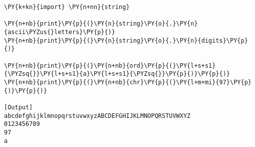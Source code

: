 \begin{Verbatim}[label=\makebox{\href{https://github.com/unipi-physics-labs/statnotes/tree/main/snippy/ascii.py}{https://github.com/.../ascii.py}},commandchars=\\\{\}]
\PY{k+kn}{import} \PY{n+nn}{string}

\PY{n+nb}{print}\PY{p}{(}\PY{n}{string}\PY{o}{.}\PY{n}{ascii\PYZus{}letters}\PY{p}{)}
\PY{n+nb}{print}\PY{p}{(}\PY{n}{string}\PY{o}{.}\PY{n}{digits}\PY{p}{)}

\PY{n+nb}{print}\PY{p}{(}\PY{n+nb}{ord}\PY{p}{(}\PY{l+s+s1}{\PYZsq{}}\PY{l+s+s1}{a}\PY{l+s+s1}{\PYZsq{}}\PY{p}{)}\PY{p}{)}
\PY{n+nb}{print}\PY{p}{(}\PY{n+nb}{chr}\PY{p}{(}\PY{l+m+mi}{97}\PY{p}{)}\PY{p}{)}

[Output]
abcdefghijklmnopqrstuvwxyzABCDEFGHIJKLMNOPQRSTUVWXYZ
0123456789
97
a
\end{Verbatim}
